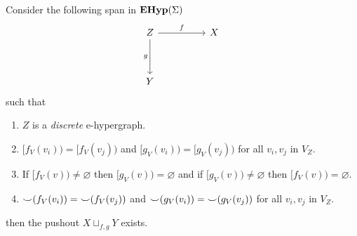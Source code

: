 \begin{theorem}
	\label{th:existence_of_pushouts}
	Consider the following span in $\mathbf{EHyp}(\Sigma)$
	\[\begin{tikzcd}
			Z && X \\
			\\
			Y
			\arrow["f", from=1-1, to=1-3]
			\arrow["g"', from=1-1, to=3-1]
		\end{tikzcd}\]
	such that
	\begin{enumerate}
		\label{pushout:assumptions}
		\item $Z$ is a \textit{discrete} e-hypergraph.
		\item \label{assumption:equal_predecessors} $[f_{V}(v_i)) = [f_{V}(v_j))$ and $[g_{V}(v_i)) = [g_{V}(v_j))$ for all $v_{i},v_{j}$ in $V_{Z}$.
		\item \label{assumption:non_ambiguous_predecessors} If $[f_{V}(v)) \not = \varnothing$ then $[g_{V}(v)) = \varnothing$ and if $[g_{V}(v)) \not = \varnothing$ then $[f_{V}(v)) = \varnothing$.
		\item ${\smile}(f_{V}(v_i)) = {\smile}(f_{V}(v_j))$ and ${\smile}(g_{V}(v_i)) = {\smile}(g_{V}(v_j))$ for all $v_i,v_j$ in $V_{Z}$.
	\end{enumerate}
	then the pushout $X \sqcup _{f,g} Y$ exists.
\end{theorem}
